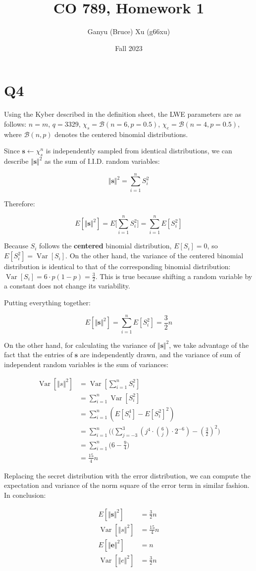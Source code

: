 \documentclass{article}
\title{CO 789, Homework 1}
\author{Ganyu (Bruce) Xu (g66xu)}
\date{Fall 2023}
\newcommand{\norm}[1]{\Vert {#1} \Vert}
\newcommand{\var}[1]{\operatorname{Var}[{#1}]}
\begin{document}

\section*{Q4}
Using the Kyber described in the definition sheet, the LWE parameters are as follows: $n = m$, $q = 3329$, $\chi_s = \mathcal{B}(n=6, p=0.5)$, $\chi_e = \mathcal{B}(n=4, p=0.5)$, where $\mathcal{B}(n, p)$ denotes the centered binomial distributions.

Since $\mathbf{s} \leftarrow \chi_s^{n}$ is independently sampled from identical distributions, we can describe $\norm{\mathbf{s}}^2$ as the sum of I.I.D. random variables:

$$
\norm{\mathbf{s}}^2 = \sum_{i=1}^{n} S_i^2
$$

Therefore:

$$
E[\norm{\mathbf{s}}^2] = E\bigg[\sum_{i=1}^{n} S_i^2\bigg] = \sum_{i=1}^{n}E[S_i^2]
$$

Because $S_i$ follows the \textbf{centered} binomial distribution, $E[S_i] = 0$, so $E[S_i^2] = \var{S_i}$. On the other hand, the variance of the centered binomial distribution is identical to that of the corresponding binomial distribution: $\var{S_i} = 6 \cdot p(1-p) = \frac{3}{2}$. This is true because shifting a random variable by a constant does not change its variability.

Putting everything together:

$$
E[\norm{\mathbf{s}}^2] = \sum_{i=1}^{n}E[S_i^2] = \frac{3}{2} n
$$

On the other hand, for calculating the variance of $\norm{\mathbf{s}}^2$, we take advantage of the fact that the entries of $\mathbf{s}$ are independently drawn, and the variance of sum of independent random variables is the sum of variances:

$$
\begin{aligned}
\var{\norm{s}^2} &= \var{\sum_{i=1}^n S_i^2} \\
&= \sum_{i=1}^n \var{S_i^2} \\
&= \sum_{i=1}^n (E[S_i^4] - E[S_i^2]^2) \\
&= \sum_{i=1}^n \bigg(
    (\sum_{j=-3}^3(j^4 \cdot \binom{6}{j} \cdot 2^{-6}) 
    - (\frac{3}{2})^2 
\bigg) \\
&= \sum_{i=1}^n \bigg( 6  - \frac{9}{4} \bigg) \\
&= \frac{15}{4}n
\end{aligned}
$$

Replacing the secret distribution with the error distribution, we can compute the expectation and variance of the norm square of the error term in similar fashion. In conclusion:

$$
\begin{aligned}
E[\norm{\mathbf{s}}^2] &= \frac{3}{2} n \\
\var{\norm{s}^2} &= \frac{15}{4}n \\
E[\norm{\mathbf{e}}^2] &= n \\
\var{\norm{e}^2} &= \frac{3}{2}n
\end{aligned}
$$
\end{document}
